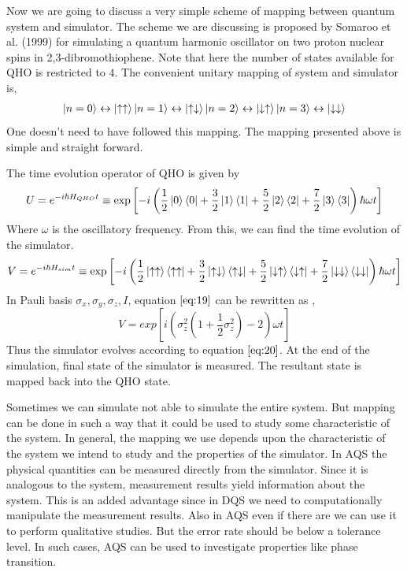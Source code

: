 \documentclass[12pt,a4paper]{report}
\begin{document}
Now we are going to discuss a very simple scheme of mapping between quantum system and simulator. The scheme we are discussing is proposed by Somaroo et al. (1999)\cite{somaroo} for simulating a quantum harmonic oscillator on two proton nuclear spins in 2,3-dibromothiophene. Note that here the number of states available for QHO is restricted to $4$. The convenient unitary mapping of system and simulator is,
\begin{gather*}
\ket{n=0} \leftrightarrow \ket{\uparrow\uparrow}
\ket{n=1} \leftrightarrow \ket{\uparrow\downarrow}
\ket{n=2} \leftrightarrow \ket{\downarrow\uparrow}
\ket{n=3} \leftrightarrow \ket{\downarrow\downarrow}
\end{gather*}
One doesn’t need to have followed this mapping. The mapping presented above is simple and straight forward. \par
The time evolution operator of QHO is given by
\begin{equation}
U = e^{-i\hbar H_{QHO} t} \equiv \exp\left[-i\left(\frac{1}{2}\ket{0}\bra{0} + \frac{3}{2}\ket{1}\bra{1} + \frac{5}{2}\ket{2}\bra{2} + \frac{7}{2}\ket{3}\bra{3}\right)\hbar\omega t\right]
\end{equation}
Where $\omega$ is the oscillatory frequency. From this, we can find the time evolution of the simulator.
\begin{equation}
\label{eq:19}
V = e^{-i\hbar H_{sim} t} \equiv \exp\left[-i\left(\frac{1}{2}\ket{\uparrow\uparrow}\bra{\uparrow\uparrow} + \frac{3}{2}\ket{\uparrow\downarrow}\bra{\uparrow\downarrow} + \frac{5}{2}\ket{\downarrow\uparrow}\bra{\downarrow\uparrow} + \frac{7}{2}\ket{\downarrow\downarrow}\bra{\downarrow\downarrow}\right)\hbar\omega t\right]
\end{equation}
In Pauli basis ${\sigma_{x},\sigma_{y},\sigma_{z},I}$, equation $\ref{eq:19}$ can be rewritten as ,
\begin{equation}
\label{eq:20}
V = exp\left[i\left(\sigma_{z}^{2}(1 + \frac{1}{2}\sigma_{z}^{2}) - 2 \right)\omega t\right]
\end{equation} 
Thus the simulator evolves according to equation $\ref{eq:20}$. At the end of the simulation, final state of the simulator is measured. The resultant state is mapped back into the QHO state.\par

Sometimes we can simulate not able to simulate the entire system. But mapping can be done in such a way that it could be used to study some characteristic of the system. In general, the mapping we use depends upon the characteristic of the system we intend to study and the properties of the simulator. In AQS the physical quantities can be measured directly from the simulator. Since it is analogous to the system, measurement results yield information about the system. This is an added advantage since in DQS we need to computationally manipulate the measurement results. Also in AQS even if there are we can use it to perform qualitative studies. But the error rate should be below a tolerance level. In such cases, AQS can be used to investigate properties like phase transition.  
\end{document}
